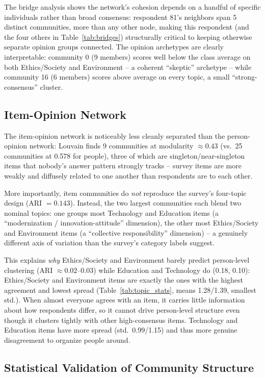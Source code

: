 \documentclass[11pt]{article}
\begin{document}
The bridge analysis shows the network's cohesion depends on a handful of specific
individuals rather than broad consensus: respondent 81's neighbors span 5 distinct
communities, more than any other node, making this respondent (and the four others in
Table~\ref{tab:bridges}) structurally critical to keeping otherwise separate opinion
groups connected. The opinion archetypes are clearly interpretable: community 0 (9
members) scores well below the class average on both Ethics/Society and Environment --
a coherent ``skeptic'' archetype -- while community 16 (6 members) scores above average
on every topic, a small ``strong-consensus'' cluster.

\subsection{Item-Opinion Network}

The item-opinion network is noticeably less cleanly separated than the person-opinion
network: Louvain finds 9 communities at modularity $\approx 0.43$ (vs.\ 25 communities
at 0.578 for people), three of which are singleton/near-singleton items that nobody's
answer pattern strongly tracks -- survey items are more weakly and diffusely related to
one another than respondents are to each other.

More importantly, item communities do \emph{not} reproduce the survey's four-topic
design (ARI $=0.143$). Instead, the two largest communities each blend two nominal
topics: one groups most Technology and Education items (a ``modernization /
innovation-attitude'' dimension), the other most Ethics/Society and Environment items
(a ``collective responsibility'' dimension) -- a genuinely different axis of variation
than the survey's category labels suggest.

This explains \emph{why} Ethics/Society and Environment barely predict person-level
clustering (ARI $\approx 0.02$--$0.03$) while Education and Technology do (0.18, 0.10):
Ethics/Society and Environment items are exactly the ones with the highest agreement
and lowest spread (Table~\ref{tab:topic_stats}, means 1.28/1.39, smallest std.). When
almost everyone agrees with an item, it carries little information about how
respondents differ, so it cannot drive person-level structure even though it clusters
tightly with other high-consensus items. Technology and Education items have more
spread (std.\ 0.99/1.15) and thus more genuine disagreement to organize people around.

\subsection{Statistical Validation of Community Structure}
\end{document}
